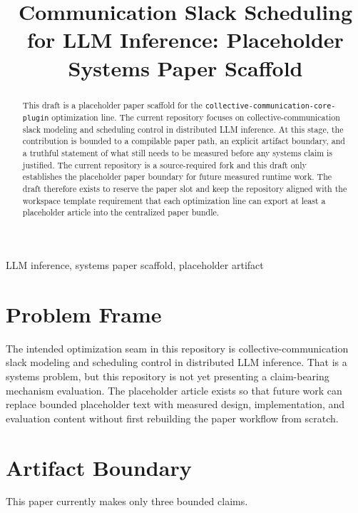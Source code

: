 \documentclass[conference]{IEEEtran}
\begin{document}
\title{Communication Slack Scheduling for LLM Inference: Placeholder Systems Paper Scaffold}

\author{}

\maketitle

\begin{abstract}
This draft is a placeholder paper scaffold for the \texttt{collective-communication-core-plugin} optimization line. The current repository focuses on collective-communication slack modeling and scheduling control in distributed LLM inference. At this stage, the contribution is bounded to a compilable paper path, an explicit artifact boundary, and a truthful statement of what still needs to be measured before any systems claim is justified. The current repository is a source-required fork and this draft only establishes the placeholder paper boundary for future measured runtime work. The draft therefore exists to reserve the paper slot and keep the repository aligned with the workspace template requirement that each optimization line can export at least a placeholder article into the centralized paper bundle.
\end{abstract}

\begin{IEEEkeywords}
LLM inference, systems paper scaffold, placeholder artifact
\end{IEEEkeywords}

\section{Problem Frame}

The intended optimization seam in this repository is collective-communication slack modeling and scheduling control in distributed LLM inference. That is a systems problem, but this repository is not yet presenting a claim-bearing mechanism evaluation. The placeholder article exists so that future work can replace bounded placeholder text with measured design, implementation, and evaluation content without first rebuilding the paper workflow from scratch.

\section{Artifact Boundary}

This paper currently makes only three bounded claims.
\end{document}
